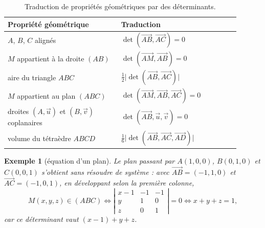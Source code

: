 \documentclass[a4paper,11pt]{article}
\numberwithin{equation}{section}
\numberwithin{figure}{section}
\numberwithin{table}{section}
\theoremstyle{enonce}
\theoremstyle{exemple}
\newtheorem{exemple}[definition]{Exemple}
\theoremstyle{remarque}
\newcommand{\vv}[1]{\overrightarrow{#1}}
\newcommand{\ve}[1]{\vec{#1}}
\newcommand{\dt}[1]{\left|\begin{matrix}#1\end{matrix}\right|}
\begin{document}
\begin{table}[H]
\centering
\renewcommand{\arraystretch}{1.3}
\begin{tabular}{p{0.44\linewidth}p{0.46\linewidth}}
\toprule
Propriété géométrique & Traduction\\\midrule
$A$, $B$, $C$ alignés & $\det(\vv{AB},\vv{AC})=0$\\
$M$ appartient à la droite $(AB)$ & $\det(\vv{AM},\vv{AB})=0$\\
aire du triangle $ABC$ & $\frac12\big|\det(\vv{AB},\vv{AC})\big|$\\\midrule
$M$ appartient au plan $(ABC)$ & $\det(\vv{AM},\vv{AB},\vv{AC})=0$\\
droites $(A,\ve u)$ et $(B,\ve v)$ coplanaires & $\det(\vv{AB},\ve u,\ve v)=0$\\
volume du tétraèdre $ABCD$ & $\frac16\big|\det(\vv{AB},\vv{AC},\vv{AD})\big|$\\\bottomrule
\end{tabular}
\caption{Traduction de propriétés géométriques par des déterminants.}
\end{table}

\begin{exemple}[équation d'un plan]
Le plan passant par $A(1,0,0)$, $B(0,1,0)$ et $C(0,0,1)$ s'obtient sans résoudre de système : avec
$\vv{AB}=(-1,1,0)$ et $\vv{AC}=(-1,0,1)$, en développant selon la première colonne,
\[M(x,y,z)\in(ABC)\iff\dt{x-1&-1&-1\\y&1&0\\z&0&1}=0\iff x+y+z=1,\]
car ce déterminant vaut $(x-1)+y+z$.
\end{exemple}
\end{document}

